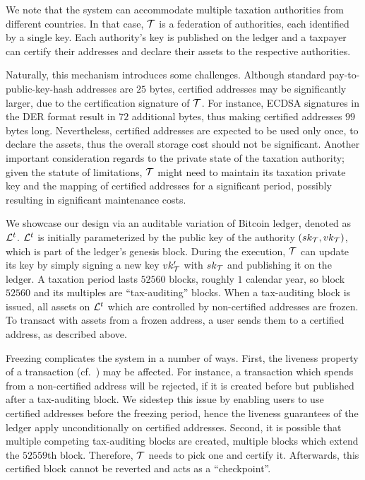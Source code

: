 We note that the system can accommodate multiple taxation authorities from
different countries. In that case, $\mathcal{T}$ is a federation of authorities,
each identified by a single key. Each authority's key is published on the
ledger and a taxpayer can certify their addresses and declare their assets to
the respective authorities.

Naturally, this mechanism introduces some challenges. Although standard
pay-to-public-key-hash addresses are $25$ bytes, certified addresses may be
significantly larger, due to the certification signature of $\mathcal{T}$. For
instance, ECDSA signatures in the DER format result in $72$ additional bytes,
thus making certified addresses $99$ bytes long. Nevertheless, certified
addresses are expected to be used only once, to declare the assets, thus the
overall storage cost should not be significant. Another important consideration
regards to the private state of the taxation authority; given the statute of
limitations, $\mathcal{T}$ might need to maintain its taxation private key and the
mapping of certified addresses for a significant period,
possibly resulting in significant maintenance costs.

We showcase our design via an auditable variation of Bitcoin ledger, denoted as
$\mathcal{L}^{t}$. $\mathcal{L}^{t}$ is initially parameterized by the public key of the
authority $(sk_{\mathcal{T}}, vk_{\mathcal{T}})$, which is
part of the ledger's genesis block. During the execution, $\mathcal{T}$ can update
its key by simply signing a new key $vk_{\mathcal{T}}'$ with
$sk_{\mathcal{T}}$ and publishing it on the ledger. A taxation period lasts
$52560$ blocks, \ie roughly $1$ calendar year, so block $52560$ and its
multiples are ``tax-auditing'' blocks.  When a tax-auditing block is issued,
all assets on $\mathcal{L}^{t}$ which are controlled by non-certified addresses are
frozen. To transact with assets from a frozen address, a user sends them to a
certified address, as described above.

Freezing complicates the system in a number of ways. First, the liveness
property of a transaction (cf.~\cite{EC:GarKiaLeo15}) may be affected. For
instance, a transaction which spends from a non-certified address will be
rejected, if it is created before but published after a tax-auditing block. We
sidestep this issue by enabling users to use certified addresses before the
freezing period, hence the liveness guarantees of the ledger apply
unconditionally on certified addresses. Second, it is possible that multiple
competing tax-auditing blocks are created, \eg multiple blocks which extend the
$52559$th block. Therefore, $\mathcal{T}$ needs to pick one and certify it.
Afterwards, this certified block cannot be reverted and acts as a
``checkpoint''.

